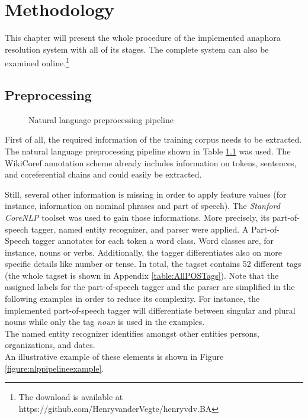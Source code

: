 \chapter{Methodology}
\label{sec:Methodology}
This chapter will present the whole procedure of the implemented anaphora resolution system with all of its stages. The complete system can also be examined online.\footnote{The download is available at https://github.com/HenryvanderVegte/henryvdv.BA}

\section{Preprocessing}
\begin{figure}[h]
	\centering

	\caption{Natural language preprocessing pipeline}
	\label{figure:nlppipeline}
\end{figure}

First of all, the required information of the training corpus needs to be extracted. The natural language preprocessing pipeline shown in Table \ref{figure:nlppipeline} was used.  The WikiCoref annotation scheme already includes information on tokens, sentences, and coreferential chains and could easily be extracted.

Still, several other information is missing in order to apply feature values (for instance, information on nominal phrases and part of speech). The \textit{Stanford CoreNLP} toolset \citep{manning-EtAl:2014:P14-5} was used to gain those informations. More precisely, its part-of-speech tagger, named entity recognizer, and parser were applied. 
A Part-of-Speech tagger annotates for each token a word class. Word classes are, for instance, nouns or verbs. Additionally, the tagger differentiates also on more specific details like number or tense. In total, the tagset contains 52 different tags (the whole tagset is shown in Appendix \ref{table:AllPOSTags}). Note that the assigned labels for the part-of-speech tagger and the parser are simplified in the following examples in order to reduce its complexity. For instance, the implemented part-of-speech tagger will differentiate between singular and plural nouns while only the tag \textit{noun} is used in the examples.\\
The named entity recognizer identifies amongst other entities persons, organizations, and dates. \\
An illustrative example of these elements is shown in Figure \ref{figure:nlppipelineexample}. 

